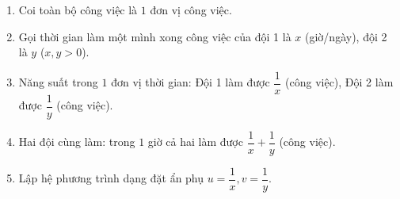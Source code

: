 \begin{enumerate}
\item Coi toàn bộ công việc là $1$ đơn vị công việc.
\item Gọi thời gian làm một mình xong công việc của đội 1 là $x$ (giờ/ngày), đội 2 là $y$ ($x, y > 0$).
\item Năng suất trong $1$ đơn vị thời gian: Đội 1 làm được $\dfrac{1}{x}$ (công việc), Đội 2 làm được $\dfrac{1}{y}$ (công việc).
\item Hai đội cùng làm: trong $1$ giờ cả hai làm được $\dfrac{1}{x} + \dfrac{1}{y}$ (công việc).
\item Lập hệ phương trình dạng đặt ẩn phụ $u = \dfrac{1}{x}, v = \dfrac{1}{y}$.
\end{enumerate}
